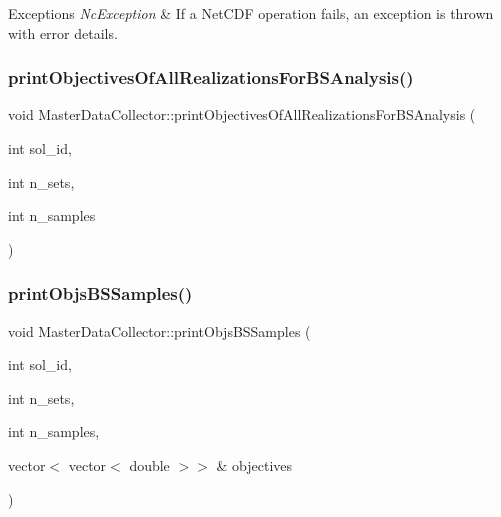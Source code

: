 \begin{DoxyExceptions}{Exceptions}
{\em Nc\+Exception} & If a Net\+C\+DF operation fails, an exception is thrown with error details. \\
\hline
\end{DoxyExceptions}
\mbox{\label{classMasterDataCollector_a03f0a7bdc1502cbe23905dbfc48e6546}} 
\subsubsection{\texorpdfstring{print\+Objectives\+Of\+All\+Realizations\+For\+B\+S\+Analysis()}{printObjectivesOfAllRealizationsForBSAnalysis()}}
{\footnotesize\ttfamily void Master\+Data\+Collector\+::print\+Objectives\+Of\+All\+Realizations\+For\+B\+S\+Analysis (\begin{DoxyParamCaption}\item[{int}]{sol\+\_\+id,  }\item[{int}]{n\+\_\+sets,  }\item[{int}]{n\+\_\+samples }\end{DoxyParamCaption})}

\mbox{\label{classMasterDataCollector_a0832afc87f9da7f7b1a70866e4ee4c6d}} 
\subsubsection{\texorpdfstring{print\+Objs\+B\+S\+Samples()}{printObjsBSSamples()}}
{\footnotesize\ttfamily void Master\+Data\+Collector\+::print\+Objs\+B\+S\+Samples (\begin{DoxyParamCaption}\item[{int}]{sol\+\_\+id,  }\item[{int}]{n\+\_\+sets,  }\item[{int}]{n\+\_\+samples,  }\item[{vector$<$ vector$<$ double $>$$>$ \&}]{objectives }\end{DoxyParamCaption})}



